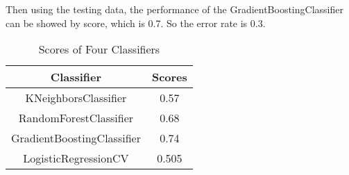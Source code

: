 \documentclass{article}
\begin{document}
Then using the testing data, the performance of the GradientBoostingClassifier can be showed by score, which is 0.7. So the error rate is 0.3.

\begin{table}[h!]
\centering

\caption{Scores of Four Classifiers}
\label{vali} 
\begin{tabular}{  | c | c | }	
\hline
Classifier & Scores  \\
\hline
KNeighborsClassifier & 0.57 \\
\hline
RandomForestClassifier & 0.68 \\
\hline
GradientBoostingClassifier & 0.74 \\
\hline
LogisticRegressionCV  & 0.505 \\
\hline

\end{tabular}
\end{table}
\end{document}
